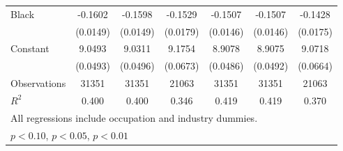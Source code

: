 {\begin{longtable}{l*{6}{c}}
Black               &     -0.1602\sym{***}&     -0.1598\sym{***}&     -0.1529\sym{***}&     -0.1507\sym{***}&     -0.1507\sym{***}&     -0.1428\sym{***}\\
                    &    (0.0149)         &    (0.0149)         &    (0.0179)         &    (0.0146)         &    (0.0146)         &    (0.0175)         \\
Constant            &      9.0493\sym{***}&      9.0311\sym{***}&      9.1754\sym{***}&      8.9078\sym{***}&      8.9075\sym{***}&      9.0718\sym{***}\\
                    &    (0.0493)         &    (0.0496)         &    (0.0673)         &    (0.0486)         &    (0.0492)         &    (0.0664)         \\
\hline  
Observations        &       31351         &       31351         &       21063         &       31351         &       31351         &       21063         \\
\(R^{2}\)           &       0.400         &       0.400         &       0.346         &       0.419         &       0.419         &       0.370         \\
\hline  
\multicolumn{7}{l}{\footnotesize All regressions include occupation and industry dummies.}\\
\multicolumn{7}{l}{\footnotesize \sym{*} \(p<0.10\), \sym{**} \(p<0.05\), \sym{***} \(p<0.01\)}\\
\end{longtable}
}
